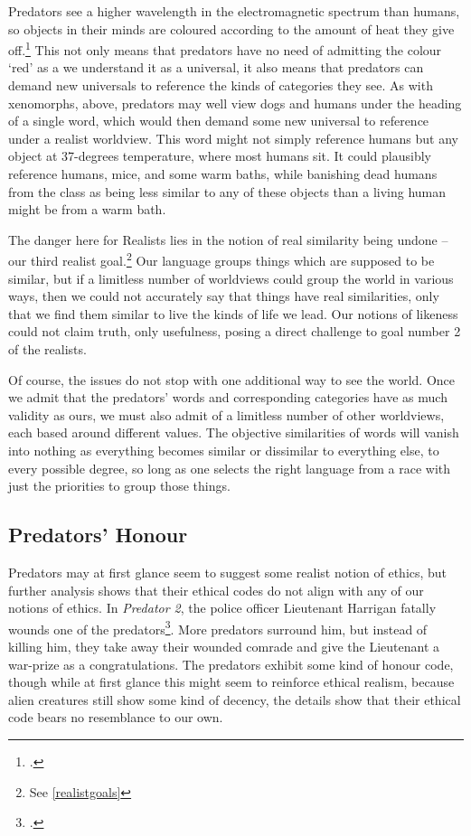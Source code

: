 \documentclass{article}
\begin{document}
Predators see a higher wavelength in the electromagnetic spectrum than humans, so objects in their minds are coloured according to the amount of heat they give off.\footcite{predator} This not only means that predators have no need of admitting the colour `red' as a we understand it as a universal, it also means that predators can demand new universals to reference the kinds of categories they see. As with xenomorphs, above, predators may well view dogs and humans under the heading of a single word, which would then demand some new universal to reference under a realist worldview. This word might not simply reference humans but any object at 37-degrees temperature, where most humans sit. It could plausibly reference humans, mice, and some warm baths, while banishing dead humans from the class as being less similar to any of these objects than a living human might be from a warm bath.

The danger here for Realists lies in the notion of real similarity being undone -- our third realist goal.\footnote{See \ref{realistgoals}} Our language groups things which are supposed to be similar, but if a limitless number of worldviews could group the world in various ways, then we could not accurately say that things have real similarities, only that we find them similar to live the kinds of life we lead. Our notions of likeness could not claim truth, only usefulness, posing a direct
challenge to goal number 2 of the realists.

Of course, the issues do not stop with one additional way to see the world. Once we admit that the predators' words and corresponding categories have as much validity as ours, we must also admit of a limitless number of other worldviews, each based around different values. The objective similarities of words will vanish into nothing as everything becomes similar or dissimilar to everything else, to every possible degree, so long as one selects the right language from a race with just the priorities to group those things.

\subsection{Predators' Honour}
Predators may at first glance seem to suggest some realist notion of ethics, but further analysis shows that their ethical codes do not align with any of our notions of ethics. In \textit{Predator 2}, the police officer Lieutenant Harrigan fatally wounds one of the predators\footcite{predator2}. More predators surround him, but instead of killing him, they take away their wounded comrade and give the Lieutenant a war-prize as a congratulations. The predators exhibit some kind of honour code, though while at first glance this might seem to reinforce ethical realism, because alien creatures still show some kind of decency, the details show that their ethical code bears no resemblance to our own.
\end{document}

